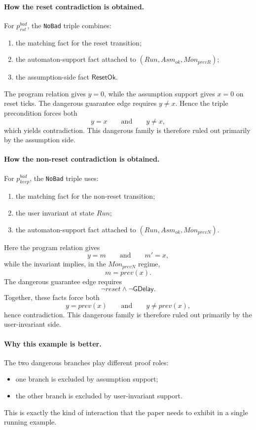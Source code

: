 \documentclass[11pt,a4paper]{article}
\newcommand{\ResetOk}{\mathsf{ResetOk}}
\newcommand{\GuardDelay}{\mathsf{GDelay}}
\begin{document}
\paragraph{How the reset contradiction is obtained.}
For \(p_{rst}^{bad}\), the \texttt{NoBad} triple combines:
\begin{enumerate}[leftmargin=1.4em]
\item the matching fact for the reset transition;
\item the automaton-support fact attached to \((Run,Asm_{ok},Mon_{prevR})\);
\item the assumption-side fact \(\ResetOk\).
\end{enumerate}
The program relation gives \(y=0\), while the assumption support gives
\(x=0\) on reset ticks. The dangerous guarantee edge requires \(y \neq x\).
Hence the triple precondition forces both
\[
y = x
\qquad\text{and}\qquad
y \neq x,
\]
which yields contradiction. This dangerous family is therefore ruled out
primarily by the assumption side.

\paragraph{How the non-reset contradiction is obtained.}
For \(p_{keep}^{bad}\), the \texttt{NoBad} triple uses:
\begin{enumerate}[leftmargin=1.4em]
\item the matching fact for the non-reset transition;
\item the user invariant at state \(Run\);
\item the automaton-support fact attached to \((Run,Asm_{ok},Mon_{prevN})\).
\end{enumerate}
Here the program relation gives
\[
y = m
\qquad\text{and}\qquad
m' = x,
\]
while the invariant implies, in the \(Mon_{prevN}\) regime,
\[
m = prev(x).
\]
The dangerous guarantee edge requires
\[
\neg reset \land \neg \GuardDelay.
\]
Together, these facts force both
\[
y = prev(x)
\qquad\text{and}\qquad
y \neq prev(x),
\]
hence contradiction. This dangerous family is therefore ruled out primarily by
the user-invariant side.

\paragraph{Why this example is better.}
The two dangerous branches play different proof roles:
\begin{itemize}[leftmargin=1.4em]
\item one branch is excluded by assumption support;
\item the other branch is excluded by user-invariant support.
\end{itemize}
This is exactly the kind of interaction that the paper needs to exhibit in a
single running example.
\end{document}
